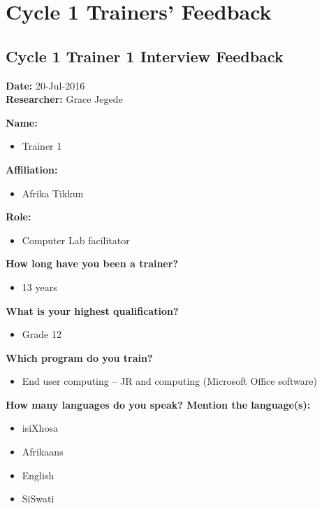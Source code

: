 \chapter{Cycle 1 Trainers’ Feedback}
\label{app:cycle1_trainers}

\section{Cycle 1 Trainer 1 Interview Feedback}

\noindent\textbf{Date:} 20-Jul-2016 \\
\noindent\textbf{Researcher:} Grace Jegede



\noindent\textbf{Name:}
\begin{itemize}
\item Trainer 1
\end{itemize}

\noindent\textbf{Affiliation:}
\begin{itemize}
\item Afrika Tikkun
\end{itemize}

\noindent\textbf{Role:}
\begin{itemize}
\item Computer Lab facilitator
\end{itemize}

\noindent\textbf{How long have you been a trainer?}
\begin{itemize}
\item 13 years
\end{itemize}

\noindent\textbf{What is your highest qualification?}
\begin{itemize}
\item Grade 12
\end{itemize}

\noindent\textbf{Which program do you train?}
\begin{itemize}
\item End user computing – JR and computing (Microsoft Office software)
\end{itemize}

\noindent\textbf{How many languages do you speak? Mention the language(s):}
\begin{itemize}
\item isiXhosa
\item Afrikaans
\item English
\item SiSwati
\end{itemize}


